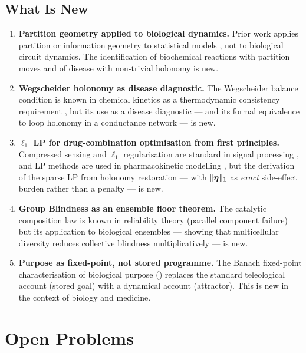 \subsection{What Is New}

\begin{enumerate}[leftmargin=2em]
  \item \textbf{Partition geometry applied to biological dynamics.}
    Prior work applies partition or information geometry to statistical models
    \citep{barabasi2004network}, not to biological circuit dynamics.  The
    identification of biochemical reactions with partition moves and of disease
    with non-trivial holonomy is new.

  \item \textbf{Wegscheider holonomy as disease diagnostic.}
    The Wegscheider balance condition is known in chemical kinetics as a
    thermodynamic consistency requirement \citep{Wegscheider1901}, but its
    use as a disease diagnostic — and its formal equivalence to loop holonomy
    in a conductance network — is new.

  \item \textbf{$\ell_1$ LP for drug-combination optimisation from first principles.}
    Compressed sensing and $\ell_1$ regularisation are standard in signal
    processing \citep{Tibshirani1996}, and LP methods are used in pharmacokinetic
    modelling \citep{Dantzig1963}, but the derivation of the sparse LP from
    holonomy restoration — with $\|\boldsymbol{\eta}\|_1$ as \emph{exact} side-effect
    burden rather than a penalty — is new.

  \item \textbf{Group Blindness as an ensemble floor theorem.}
    The catalytic composition law is known in reliability theory (parallel
    component failure) but its application to biological ensembles — showing
    that multicellular diversity reduces collective blindness multiplicatively
    — is new.

  \item \textbf{Purpose as fixed-point, not stored programme.}
    The Banach fixed-point characterisation of biological purpose
    () replaces the standard teleological account
    (stored goal) with a dynamical account (attractor).  This is new in the
    context of biology and medicine.
\end{enumerate}

\section{Open Problems}
\label{sec:open-problems}

